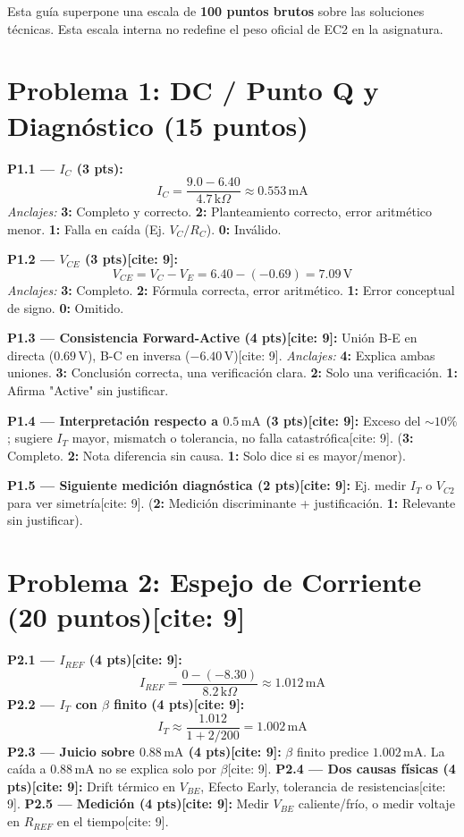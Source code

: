 \documentclass[11pt, a4paper]{article}
\begin{document}
\begin{tcolorbox}[colback=ucbblue!5, colframe=ucbblue, title=\textbf{Suplemento de Solucionario Técnico: Mapa de Puntaje EC2}]
    Esta guía superpone una escala de \textbf{100 puntos brutos} sobre las soluciones técnicas. Esta escala interna no redefine el peso oficial de EC2 en la asignatura.
\end{tcolorbox}

\section*{Problema 1: DC / Punto Q y Diagnóstico (15 puntos)}
\textbf{P1.1 — $I_C$ (3 pts):} $$ I_C = \frac{9.0 - 6.40}{4.7\,\text{k}\Omega} \approx 0.553\,\text{mA} $$
\textit{Anclajes:} \textbf{3:} Completo y correcto. \textbf{2:} Planteamiento correcto, error aritmético menor. \textbf{1:} Falla en caída (Ej. $V_C/R_C$). \textbf{0:} Inválido.

\noindent\textbf{P1.2 — $V_{CE}$ (3 pts)[cite: 9]:} $$ V_{CE} = V_C - V_E = 6.40 - (-0.69) = 7.09\,\text{V} $$
\textit{Anclajes:} \textbf{3:} Completo. \textbf{2:} Fórmula correcta, error aritmético. \textbf{1:} Error conceptual de signo. \textbf{0:} Omitido.

\noindent\textbf{P1.3 — Consistencia Forward-Active (4 pts)[cite: 9]:} 
Unión B-E en directa ($0.69\,\text{V}$), B-C en inversa ($-6.40\,\text{V}$)[cite: 9].
\textit{Anclajes:} \textbf{4:} Explica ambas uniones. \textbf{3:} Conclusión correcta, una verificación clara. \textbf{2:} Solo una verificación. \textbf{1:} Afirma "Active" sin justificar.

\noindent\textbf{P1.4 — Interpretación respecto a $0.5\,\text{mA}$ (3 pts)[cite: 9]:} Exceso del $\sim 10\%$; sugiere $I_T$ mayor, mismatch o tolerancia, no falla catastrófica[cite: 9]. (\textbf{3:} Completo. \textbf{2:} Nota diferencia sin causa. \textbf{1:} Solo dice si es mayor/menor).

\noindent\textbf{P1.5 — Siguiente medición diagnóstica (2 pts)[cite: 9]:} Ej. medir $I_T$ o $V_{C2}$ para ver simetría[cite: 9]. (\textbf{2:} Medición discriminante + justificación. \textbf{1:} Relevante sin justificar).

\section*{Problema 2: Espejo de Corriente (20 puntos)[cite: 9]}
\textbf{P2.1 — $I_{REF}$ (4 pts)[cite: 9]:} $$ I_{REF} = \frac{0 - (-8.30)}{8.2\,\text{k}\Omega} \approx 1.012\,\text{mA} $$
\textbf{P2.2 — $I_T$ con $\beta$ finito (4 pts)[cite: 9]:} $$ I_T \approx \frac{1.012}{1 + 2/200} = 1.002\,\text{mA} $$
\textbf{P2.3 — Juicio sobre $0.88\,\text{mA}$ (4 pts)[cite: 9]:} $\beta$ finito predice $1.002\,\text{mA}$. La caída a $0.88\,\text{mA}$ no se explica solo por $\beta$[cite: 9].
\textbf{P2.4 — Dos causas físicas (4 pts)[cite: 9]:} Drift térmico en $V_{BE}$, Efecto Early, tolerancia de resistencias[cite: 9].
\textbf{P2.5 — Medición (4 pts)[cite: 9]:} Medir $V_{BE}$ caliente/frío, o medir voltaje en $R_{REF}$ en el tiempo[cite: 9].
\end{document}

